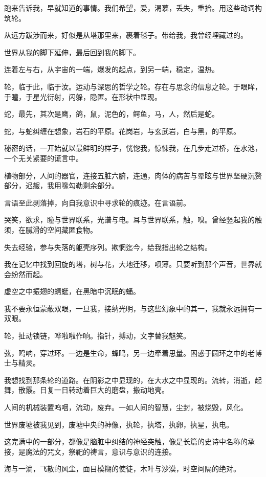 \documentclass[UTF8]{article}
\begin{document}
\par 跑来告诉我，早就知道的事情。我们希望，爱，渴慕，丢失，重拾。用这些动词构筑轮。
\par 从远方跋涉而来，好似是从塔那里来，裹着毯子。带给我，我曾经埋藏过的。
\par 世界从我的脚下延伸，最后回到我的脚下。
\par 连着左与右，从宇宙的一端，爆发的起点，到另一端，稳定，温热。
\par 轮，临于此，临于汝。运动与深思的哲学之轮。存在与思念的信息之轮。于眼眸，于瞳，于星光衍射，闪躲，隐匿。在形状中显现。
\par 蛇，最先，其次是鹰，鸽，鼠，泥色的，鳄鱼，马，人，然后是蛇。
\par 蛇，与蛇纠缠在想象，岩石的平原。花岗岩，与玄武岩，白与黑，的平原。
\par 秘密的话，一开始就以最鲜明的样子，恍惚我，惊悚我，在几步走过桥，在水池，一个无关紧要的谎言中。
\par 植物部分，人间的器官，连接五脏六腑，连通，肉体的病苦与晕眩与世界坚硬沉赘部分，迟赧，我用喙勾勒剩余部分。
\par 言语至此剥落掉，向自我意识中寻求轮的痕迹。在言语前。
\par 哭笑，欲求，瞳与世界联系，光谱与电。耳与世界联系，触，嗅。曾经竖起我的触须，在腻滑的空间藏匿食物。
\par 失去经验，参与失落的躯壳序列。欺惘迄今，给我指出轮之结构。
\par 我在记忆中找到回旋的塔，树与花，大地迁移，喷薄。只要听到那个声音，世界就会纷然而起。
\par 虚空之中振翅的蜻蜓，在黑暗中沉眠的蛹。
\par 我不要永恒蒙蔽双眼，一旦我，接纳光明，与这些幻象中的其一，我就永远拥有一双眼。
\par 轮，扯动锁链，哗啦啦作响。指针，搏动，文字替我魅笑。
\par 弦，鸣响，穿过环。一边是生命，蜂鸣，另一边牵着思量。困惑于圆环之中的老博士与精灵。
\par 我想找到那条轮的道路。在阴影之中显现的，在大水之中显现的。流转，消逝，起舞，散霰。日复一日转动着巨大的磨盘，搬动地壳。
\par 人间的机械装置呜咽，流动，废弃。一如人间的智慧，尘封，被烧毁，风化。
\par 世界废墟被我见到，废墟中央的神像，执轮，执塔，执卵，执星，执电。
\par 这完满中的一部分，都像是脑脏中纠结的神经突触，像是长篇的史诗中名称的承接，是魔法的咒文，祭祀的祷言，意识与意识的连接。
\par 海与一滴，飞散的风尘，面目模糊的使徒，木叶与沙漠，时空间隔的绝对。
\end{document}
